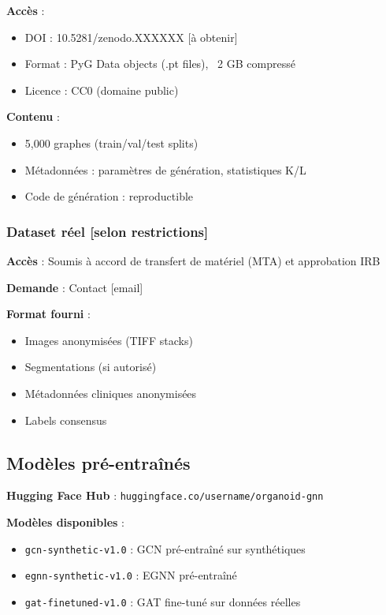 \textbf{Accès} :
\begin{itemize}
    \item DOI : 10.5281/zenodo.XXXXXX [à obtenir]
    \item Format : PyG Data objects (.pt files), ~2 GB compressé
    \item Licence : CC0 (domaine public)
\end{itemize}

\textbf{Contenu} :
\begin{itemize}
    \item 5,000 graphes (train/val/test splits)
    \item Métadonnées : paramètres de génération, statistiques K/L
    \item Code de génération : reproductible
\end{itemize}

\subsubsection{Dataset réel [selon restrictions]}

\textbf{Accès} : Soumis à accord de transfert de matériel (MTA) et approbation IRB

\textbf{Demande} : Contact [email]

\textbf{Format fourni} :
\begin{itemize}
    \item Images anonymisées (TIFF stacks)
    \item Segmentations (si autorisé)
    \item Métadonnées cliniques anonymisées
    \item Labels consensus
\end{itemize}

\subsection{Modèles pré-entraînés}

\textbf{Hugging Face Hub} : \texttt{huggingface.co/username/organoid-gnn}

\textbf{Modèles disponibles} :
\begin{itemize}
    \item \texttt{gcn-synthetic-v1.0} : GCN pré-entraîné sur synthétiques
    \item \texttt{egnn-synthetic-v1.0} : EGNN pré-entraîné
    \item \texttt{gat-finetuned-v1.0} : GAT fine-tuné sur données réelles
\end{itemize}

